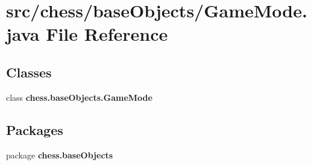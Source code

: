 \section{src/chess/base\+Objects/\+Game\+Mode.java File Reference}
\label{_game_mode_8java}
\subsection*{Classes}
\begin{DoxyCompactItemize}
\item 
class {\bf chess.\+base\+Objects.\+Game\+Mode}
\end{DoxyCompactItemize}
\subsection*{Packages}
\begin{DoxyCompactItemize}
\item 
package {\bf chess.\+base\+Objects}
\end{DoxyCompactItemize}
